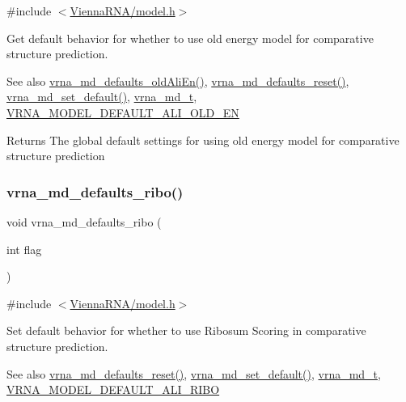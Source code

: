 {\ttfamily \#include $<$\mbox{\hyperlink{model_8h}{Vienna\+R\+N\+A/model.\+h}}$>$}



Get default behavior for whether to use old energy model for comparative structure prediction. 

\begin{DoxySeeAlso}{See also}
\mbox{\hyperlink{group__model__details_ga41521d5b9fb7e0f31e7ea73f5792afab}{vrna\+\_\+md\+\_\+defaults\+\_\+old\+Ali\+En()}}, \mbox{\hyperlink{group__model__details_ga70834424cf804d149937de89f80ceb45}{vrna\+\_\+md\+\_\+defaults\+\_\+reset()}}, \mbox{\hyperlink{group__model__details_ga8ac6ff84936282436f822644bf841f66}{vrna\+\_\+md\+\_\+set\+\_\+default()}}, \mbox{\hyperlink{group__model__details_ga1f8a10e12a0a1915f2a4eff0b28ea17c}{vrna\+\_\+md\+\_\+t}}, \mbox{\hyperlink{group__model__details_ga2a5bbfc1edf33077e39466d2d9807115}{V\+R\+N\+A\+\_\+\+M\+O\+D\+E\+L\+\_\+\+D\+E\+F\+A\+U\+L\+T\+\_\+\+A\+L\+I\+\_\+\+O\+L\+D\+\_\+\+EN}} 
\end{DoxySeeAlso}
\begin{DoxyReturn}{Returns}
The global default settings for using old energy model for comparative structure prediction 
\end{DoxyReturn}
\mbox{\label{group__model__details_ga937c45e1d06fd6168730a9b08d130be3}} 
\subsubsection{\texorpdfstring{vrna\_md\_defaults\_ribo()}{vrna\_md\_defaults\_ribo()}}
{\footnotesize\ttfamily void vrna\+\_\+md\+\_\+defaults\+\_\+ribo (\begin{DoxyParamCaption}\item[{int}]{flag }\end{DoxyParamCaption})}



{\ttfamily \#include $<$\mbox{\hyperlink{model_8h}{Vienna\+R\+N\+A/model.\+h}}$>$}



Set default behavior for whether to use Ribosum Scoring in comparative structure prediction. 

\begin{DoxySeeAlso}{See also}
\mbox{\hyperlink{group__model__details_ga70834424cf804d149937de89f80ceb45}{vrna\+\_\+md\+\_\+defaults\+\_\+reset()}}, \mbox{\hyperlink{group__model__details_ga8ac6ff84936282436f822644bf841f66}{vrna\+\_\+md\+\_\+set\+\_\+default()}}, \mbox{\hyperlink{group__model__details_ga1f8a10e12a0a1915f2a4eff0b28ea17c}{vrna\+\_\+md\+\_\+t}}, \mbox{\hyperlink{group__model__details_ga64b3ab65a9ca42d4ad1d05e193083147}{V\+R\+N\+A\+\_\+\+M\+O\+D\+E\+L\+\_\+\+D\+E\+F\+A\+U\+L\+T\+\_\+\+A\+L\+I\+\_\+\+R\+I\+BO}} 
\end{DoxySeeAlso}

